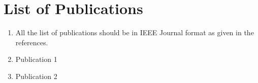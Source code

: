 	\newpage
	\normalsize{}

	\chapter*{List of Publications}
	\begin{enumerate}
		\item All the list of publications should be in IEEE Journal format as given in the references.
		\item Publication 1
		\item Publication 2
	\end{enumerate}